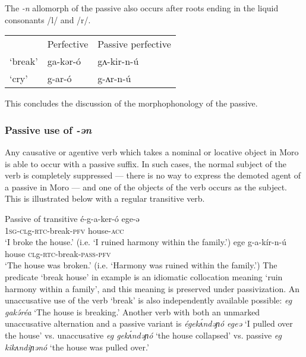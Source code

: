The \textit{-n} allomorph of the passive also occurs after roots ending in the liquid consonants /l/ and /r/.  %

\ea 
\begin{tabular}[t]{lll}
& Perfective & Passive perfective \\
`break' & {ga-kər-ó} & {gʌ-kir-n-ú} \\
`cry' & {g-ar-ó} & {g-ʌr-n-ú} \\ 	
\end{tabular}
\z 
This concludes the discussion of the morphophonology of the passive.




\subsubsection{Passive use of \textit{-ən}}\label{sec:ch11:passpass}

Any causative or agentive verb which takes a nominal or locative object in Moro is able to occur with a passive suffix. In such cases, the normal subject of the verb is completely suppressed --- there is no way to express the demoted agent of a passive in Moro --- and one of the objects of the verb occurs as the subject. This is illustrated below with a regular transitive verb.

\ea  Passive of transitive \label{ex:ch11:pass1}
\ea \gll é-g-a-ker-ó ege-ə \\
\textsc{1sg-cl}g-\textsc{rtc}-break-\textsc{pfv} house-\textsc{acc}\\
\glt ‘I broke the house.’ (i.e. `I ruined harmony within the family.')
\ex  \gll ege g-a-kír-n-ú\\
house \textsc{cl}g-\textsc{rtc}-break-\textsc{pass-pfv} \\
\glt ‘The house was broken.’ (i.e. `Harmony was ruined within the family.')
\z 
\z 
The predicate `break house' in example  is an idiomatic collocation meaning `ruin harmony within a family', and this meaning is preserved under passivization. An unaccusative use of the verb `break' is also independently available possible: \textit{eg gakə́réa} `The house is breaking.' Another verb with both an unmarked unaccusative alternation and a passive variant is \textit{égekʌ́ndəɲó egeə} `I pulled over the house' vs. unaccusative \textit{eg gekʌ́ndəɲó} `the house collapsed' vs.   passive \textit{eg kikʌndiɲənó} `the house was pulled over.'  

